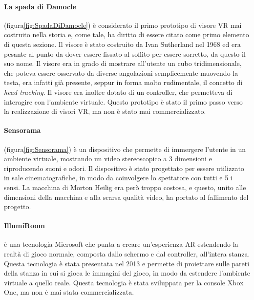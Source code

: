         \paragraph{La spada di Damocle} (figura\ref{fig:SpadaDiDamocle}) è considerato  il primo prototipo di visore VR mai costruito nella storia e, come tale, ha diritto di essere
            citato come primo elemento di questa sezione. Il visore è stato costruito da Ivan Sutherland nel 1968 ed era pesante al punto da dover essere fissato al soffito per
            essere sorretto, da questo il suo nome. Il visore era in grado di mostrare all'utente un cubo tridimensionale, che poteva essere osservato da diverse angolazioni 
            semplicemente muovendo la testa, era infatti già presente, seppur in forma molto rudimentale, il concetto di \textit{head tracking}. Il visore era inoltre dotato di un 
            controller, che permetteva di interagire con l'ambiente virtuale. Questo prototipo è stato il primo passo verso la realizzazione di visori VR, ma non è stato
            mai commercializzato.

        \paragraph{Sensorama} (figura\ref{fig:Sensorama}) è un dispositivo che permette di immergere l'utente in un
            ambiente virtuale, mostrando un video stereoscopico a 3 dimensioni e riproducendo suoni e odori. Il dispositivo è stato
            progettato per essere utilizzato in sale cinematografiche, in modo da coinvolgere lo spettatore con tutti e 5 i sensi.
            La macchina di Morton Heilig era però troppo costosa, e questo, unito alle dimensioni della macchina e alla scarsa qualità
            video, ha portato al fallimento del progetto.

        \paragraph{IllumiRoom} è una tecnologia Microsoft che punta a creare un'esperienza AR estendendo la realtà di gioco
            normale, composta dallo schermo e dal controller, all'intera stanza. Questa tecnologia è stata presentata nel 2013
            e permette di proiettare sulle pareti della stanza in cui si gioca le immagini del gioco, in modo da estendere
            l'ambiente virtuale a quello reale. Questa tecnologia è stata sviluppata per la console Xbox One, ma non è mai
            stata commercializzata.\cite{Schmalstieg2016}
        
